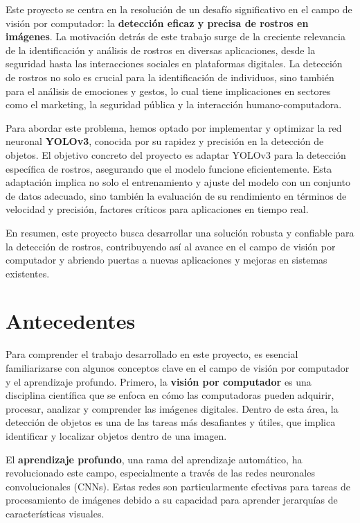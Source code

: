 \documentclass[10pt,twocolumn,letterpaper]{article}
\begin{document}
Este proyecto se centra en la resolución de un desafío significativo en el campo de visión por computador: la \textbf{detección eficaz y precisa de rostros en imágenes}. La motivación detrás de este trabajo surge de la creciente
relevancia de la identificación y análisis de rostros en diversas aplicaciones, desde la seguridad hasta las interacciones sociales en plataformas digitales. La detección de rostros no solo es crucial para la identificación de 
individuos, sino también para el análisis de emociones y gestos, lo cual tiene implicaciones en sectores como el marketing, la seguridad pública y la interacción humano-computadora.

Para abordar este problema, hemos optado por implementar y optimizar la red neuronal \textbf{YOLOv3}, conocida por su rapidez y precisión en la detección de objetos. El objetivo concreto del proyecto es adaptar YOLOv3 para la 
detección específica de rostros, asegurando que el modelo funcione eficientemente. Esta adaptación implica no solo el entrenamiento y ajuste del modelo con un conjunto de datos adecuado, sino también la evaluación de su 
rendimiento en términos de velocidad y precisión, factores críticos para aplicaciones en tiempo real.

En resumen, este proyecto busca desarrollar una solución robusta y confiable para la detección de rostros, contribuyendo así al avance en el campo de visión por computador y abriendo puertas a nuevas aplicaciones y mejoras 
en sistemas existentes.

\section{Antecedentes}

Para comprender el trabajo desarrollado en este proyecto, es esencial familiarizarse con algunos conceptos clave en el campo de visión por computador y el aprendizaje profundo. Primero, la \textbf{visión por computador} es una disciplina 
científica que se enfoca en cómo las computadoras pueden adquirir, procesar, analizar y comprender las imágenes digitales. Dentro de esta área, la detección de objetos es una de las tareas más desafiantes y útiles, que implica identificar 
y localizar objetos dentro de una imagen.

El \textbf{aprendizaje profundo}, una rama del aprendizaje automático, ha revolucionado este campo, especialmente a través de las redes neuronales convolucionales (CNNs). Estas redes son particularmente efectivas para tareas de procesamiento de 
imágenes debido a su capacidad para aprender jerarquías de características visuales.
\end{document}
